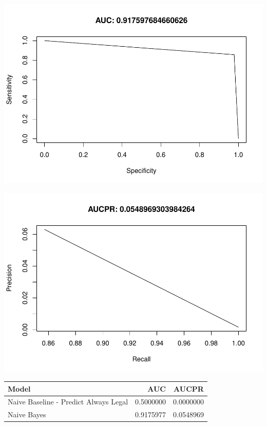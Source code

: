 \documentclass[]{article}
\begin{document}
\begin{center}\includegraphics{Credit_Card_Fraud_Detection_Project_Report_files/figure-latex/unnamed-chunk-17-2} \end{center}

\begin{center}\includegraphics{Credit_Card_Fraud_Detection_Project_Report_files/figure-latex/unnamed-chunk-17-3} \end{center}

\begin{table}[H]
\centering\begingroup\fontsize{10}{12}\selectfont

\begin{tabular}{l|r|r}
\hline
Model & AUC & AUCPR\\
\hline
Naive Baseline - Predict Always Legal & 0.5000000 & 0.0000000\\
\hline
Naive Bayes & 0.9175977 & 0.0548969\\
\hline
\end{tabular}
\endgroup{}
\end{table}
\newpage
\end{document}
